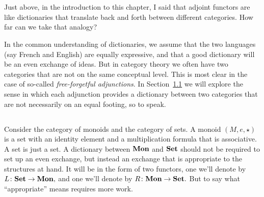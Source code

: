 \documentclass[../main/CT4S-EN-RU]{subfiles}
\begin{document}
\section{}

\begin{blockENG}
Just above, in the introduction to this chapter, I said that adjoint functors are like dictionaries that translate back and forth between different categories. How far can we take that analogy?
\end{blockENG}

\begin{blockRUS}
\end{blockRUS}

\begin{blockENG}
In the common understanding of dictionaries, we assume that the two languages (say French and English) are equally expressive, and that a good dictionary will be an even exchange of ideas. But in category theory we often have two categories that are not on the same conceptual level. This is most clear in the case of so-called {\em free-forgetful adjunctions}. In Section~\ref{sec:adjoints discuss and define} we will explore the sense in which each adjunction provides a dictionary between two categories that are not necessarily on an equal footing, so to speak.
\end{blockENG}

\begin{blockRUS}
\end{blockRUS}


\subsection{}\label{sec:adjoints discuss and define}

\begin{blockENG}
Consider the category of monoids and the category of sets. A monoid $(M,e,\star)$ is a set with an identity element and a multiplication formula that is associative. A set is just a set. A dictionary between ${\mathbf{Mon}}$ and ${\mathbf{Set}}$ should not be required to set up an even exchange, but instead an exchange that is appropriate to the structures at hand. It will be in the form of two functors, one we'll denote by $L\colon{\mathbf{Set}}\rightarrow{\mathbf{Mon}},$ and one we'll denote by $R\colon{\mathbf{Mon}}\rightarrow{\mathbf{Set}}.$ But to say what “appropriate” means requires more work.
\end{blockENG}
\end{document}
